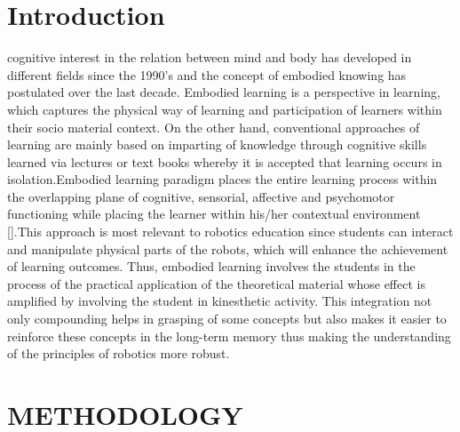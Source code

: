 

\section{Introduction}

 cognitive interest in the relation between mind and body has developed in different fields since the 1990’s and the concept of embodied knowing has postulated over the last decade. Embodied learning is a perspective in learning, which captures the physical way of learning and participation of learners within their socio material context. On the other hand, conventional approaches of learning are mainly based on imparting of knowledge through cognitive skills learned via lectures or text books whereby it is accepted that learning occurs in isolation.Embodied learning paradigm places the entire learning process within the overlapping plane of cognitive, sensorial, affective and psychomotor functioning while placing the learner within his/her contextual environment [].This approach is most relevant to robotics education since students can interact and manipulate physical parts of the robots, which will enhance the achievement of learning outcomes. Thus, embodied learning involves the students in the process of the practical application of the theoretical material whose effect is amplified by involving the student in kinesthetic activity. This integration not only compounding helps in grasping of some concepts but also makes it easier to reinforce these concepts in the long-term memory thus making the understanding of the principles of robotics more robust.\\






\section{METHODOLOGY}




